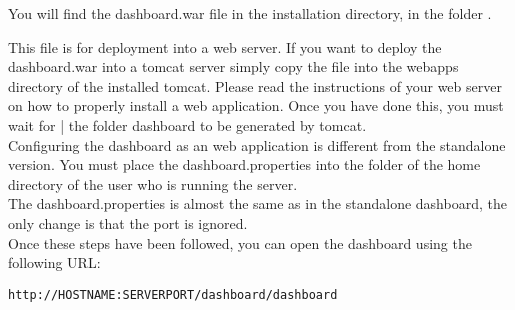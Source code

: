 You will find the dashboard.war file in the installation directory, in the folder .

This file is for deployment into a web server. If you want to deploy the dashboard.war into a tomcat server simply copy the file into the webapps directory of the installed tomcat. Please read the instructions of your web server on how to properly install a web application. Once you have done this, you must wait for | the folder dashboard to be generated by tomcat. \\
Configuring the dashboard as an web application is different from the standalone version. You must place the dashboard.properties into the  folder of the home directory of the user who is running the server.\\
The dashboard.properties is almost the same as in the standalone dashboard, the only change is that the port is ignored. \\
Once these steps have been followed, you can open the dashboard using the following URL:
\begin{verbatim}
http://HOSTNAME:SERVERPORT/dashboard/dashboard
\end{verbatim}
